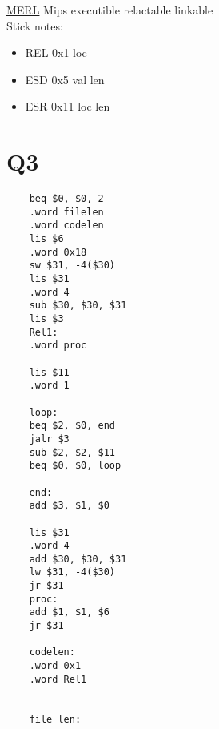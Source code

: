 \documentclass[12pt]{article}
\begin{document}
	\underline{MERL} Mips executible relactable linkable\\
	Stick notes:
	\begin{itemize}
		\item REL 0x1 loc
		\item ESD 0x5 val len
		\item ESR 0x11 loc len
	\end{itemize}
	
	
	\section*{Q3}
	\begin{verbatim}
	beq $0, $0, 2
	.word filelen
	.word codelen
	lis $6
	.word 0x18
	sw $31, -4($30)
	lis $31
	.word 4
	sub $30, $30, $31
	lis $3
	Rel1: 
	.word proc
	
	lis $11
	.word 1
	
	loop:
	beq $2, $0, end
	jalr $3
	sub $2, $2, $11
	beq $0, $0, loop
	
	end:
	add $3, $1, $0
	
	lis $31
	.word 4
	add $30, $30, $31
	lw $31, -4($30)
	jr $31
	proc:
	add $1, $1, $6
	jr $31
	
	codelen:
	.word 0x1
	.word Rel1
	
	
	file len: 
	\end{verbatim}
	
\end{document}
